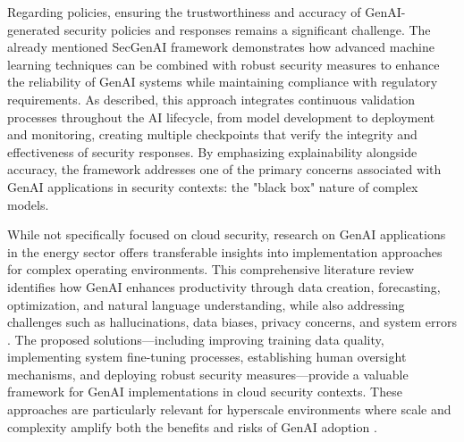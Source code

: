 Regarding policies, ensuring the trustworthiness and accuracy of GenAI-generated security policies and responses remains a significant challenge. The already mentioned SecGenAI framework demonstrates how advanced machine learning techniques can be combined with robust security measures to enhance the reliability of GenAI systems while maintaining compliance with regulatory requirements.\cite{haryanto_secgenai_2024}
As described, this approach integrates continuous validation processes throughout the AI lifecycle, from model development to deployment and monitoring, creating multiple checkpoints that verify the integrity and effectiveness of security responses. By emphasizing explainability alongside accuracy, the framework addresses one of the primary concerns associated with GenAI applications in security contexts: the "black box" nature of complex models.\cite{haryanto_secgenai_2024}

While not specifically focused on cloud security, research on GenAI applications in the energy sector offers transferable insights into implementation approaches for complex operating environments. This comprehensive literature review identifies how GenAI enhances productivity through data creation, forecasting, optimization, and natural language understanding, while also addressing challenges such as hallucinations, data biases, privacy concerns, and system errors \cite{surathunmanun_exploring_2024}.
The proposed solutions—including improving training data quality, implementing system fine-tuning processes, establishing human oversight mechanisms, and deploying robust security measures—provide a valuable framework for GenAI implementations in cloud security contexts. These approaches are particularly relevant for hyperscale environments where scale and complexity amplify both the benefits and risks of GenAI adoption \cite{surathunmanun_exploring_2024}.




